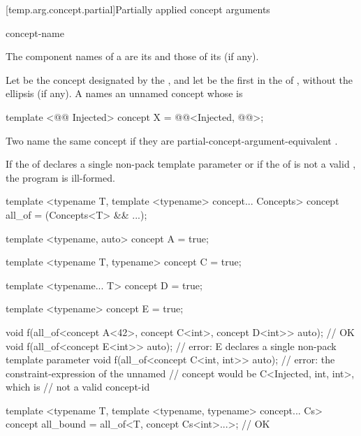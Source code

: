 \documentclass{wg21}
\begin{document}
\begin{addedblock}

[temp.arg.concept.partial]{Partially applied concept arguments}


\begin{bnf}
    \br
      concept-name \terminal{<}  \terminal{>}
\end{bnf}


\pnum
The component names of a  are
its  and
those of its  (if any).

Let  be the concept designated by the , and let  be the first  in the  of , without the ellipsis (if any).
A  names an unnamed concept  whose  is

\begin{codeblock}
template <@@ Injected>
concept X = @@<Injected, @@>;
\end{codeblock}

Two  name the same concept if they are partial-concept-argument-equivalent .

If the  of  declares a single non-pack template parameter or if the  of  is not a valid , the program is ill-formed.

\begin{example}
\begin{colorblock}
template <typename T, template <typename> concept... Concepts>
concept all_of = (Concepts<T> && ...);

template <typename, auto>
concept A = true;

template <typename T, typename>
concept C = true;

template <typename... T>
concept D = true;

template <typename>
concept E = true;

void f(all_of<concept A<42>, concept C<int>, concept D<int>> auto); // OK
void f(all_of<concept E<int>> auto); // error: E declares a single non-pack template parameter
void f(all_of<concept C<int, int>> auto); // error: the constraint-expression of the unnamed
                                          // concept would be C<Injected, int, int>, which is
                                          // not a valid concept-id

template <typename T, template <typename, typename> concept... Cs>
concept all_bound = all_of<T, concept Cs<int>...>; // OK
\end{colorblock}
\end{example}

\end{addedblock}
\end{document}
